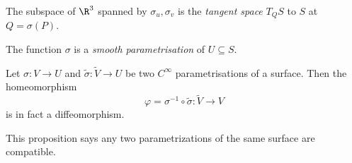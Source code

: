 \documentclass[a4paper]{article}
\begin{document}
\begin{defi}
  The subspace of $\R^3$ spanned by $\sigma_u, \sigma_v$ is the \emph{tangent space} $T_QS$ to $S$ at $Q = \sigma(P)$.
\end{defi}

\begin{defi}
  The function $\sigma$ is a \emph{smooth parametrisation} of $U \subseteq S$.
\end{defi}

\begin{prop}
  Let $\sigma: V \to U$ and $\tilde{\sigma}: \tilde{V} \to U$ be two $C^\infty$ parametrisations of a surface. Then the homeomorphism
  \[
    \varphi = \sigma^{-1} \circ \tilde{\sigma}: \tilde{V} \to V
  \]
  is in fact a diffeomorphism.
\end{prop}
This proposition says any two parametrizations of the same surface are compatible.
\end{document}
